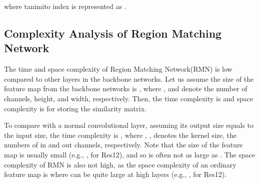 \documentclass[letterpaper]{article}
\begin{document}
where tanimito index is represented as .

\subsection{Complexity Analysis of Region Matching Network}
The time and space complexity of Region Matching Network(RMN) is low compared to other layers in the backbone networks. Let us assume the size of the feature map from the backbone networks is , where ,  and  denote the number of channels, height, and width, respectively. Then, the time complexity is  and space complexity is  for storing the similarity matrix.

To compare with a normal convolutional layer, assuming its output size equals to the input size, the time complexity is , where , ,  denotes the kernel size, the numbers of in and out channels, respectively. Note that the size of the feature map is usually small (e.g., , for Res12), and so  is often not as large as . The space complexity of RMN  is also not high, as the space complexity of an ordinary feature map is  where  can be quite large at high layers (e.g., , for Res12).
\end{document}
